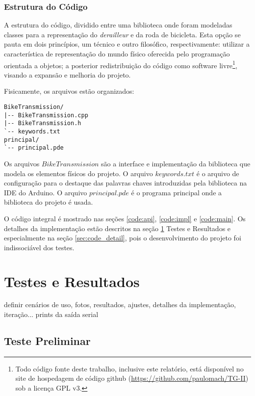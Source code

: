 \documentclass[a4paper,11pt]{article}
\begin{document}
\subsubsection{Estrutura do Código}
\label{sec:implemt}

A estrutura do código, dividido entre uma biblioteca onde foram modeladas
classes para a representação do \textit{derailleur} e da roda de bicicleta. Esta
opção se pauta em dois princípios, um técnico e outro filosófico,
respectivamente: utilizar a característica de representação do mundo físico
oferecida pelo programação orientada a objetos; a posterior redistribuição do
código como software livre\footnote{Todo código fonte deste trabalho, inclusive
este relatório, está disponível no site de hospedagem de código github
(\url{https://github.com/paulomach/TG-II}) sob a licença GPL v3\cite{gpl}.},
visando a expansão e melhoria do projeto.

Fisicamente, os arquivos estão organizados:

\begin{verbatim}
BikeTransmission/
|-- BikeTransmission.cpp
|-- BikeTransmission.h
`-- keywords.txt
principal/
`-- principal.pde
\end{verbatim}

Os arquivos $BikeTransmission$ são a interface e implementação da biblioteca
que modela os elementos físicos do projeto. O arquivo $keywords.txt$ é o arquivo
de configuração para o destaque das palavras chaves introduzidas pela biblioteca
na IDE do Arduino. O arquivo $principal.pde$ é o programa principal onde a
biblioteca do projeto é usada.

O código integral é mostrado nas seções \ref{code:api}, \ref{code:impl} e
\ref{code:main}. Os detalhes da implementação estão descritos na seção
\ref{sec:resultados} Testes e Resultados e especialmente na seção
\ref{sec:code_detail}, pois o desenvolvimento do projeto foi indissociável dos
testes.

\pagebreak
%
\section{Testes e Resultados}
\label{sec:resultados}
definir cenários de uso, fotos, resultados, ajustes,
detalhes da implementação, iteração... prints da saída serial

\subsection{Teste Preliminar}
\end{document}
